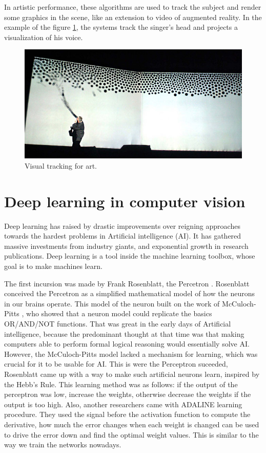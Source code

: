 In artistic performance, these algorithms are used to track the subject and render some graphics in the scene, like an extension to video of augmented reality. In the example of the figure \ref{introTracking4}, the systems track the singer's head and projects a visualization of his voice.

\begin{figure}[H]
\centering         
\includegraphics[width=12cm]{aplicaciones/singing.jpg}
\caption{Visual tracking for art.} \label{introTracking4}
\end{figure}


\section{Deep learning in computer vision}

Deep learning has raised by drastic improvements over reigning approaches towards the hardest problems in Artificial intelligence (AI). It has gathered massive investments from industry giants, and exponential growth in research publications. Deep learning is a tool inside the machine learning toolbox, whose goal is to make machines learn.

The first incursion was made by Frank Rosenblatt, the Percetron \cite{rosenblat}. Rosenblatt conceived the Percetron as a simplified mathematical model of how the neurons in our brains operate. This model of the neuron built on the work of McCuloch-Pitts \cite{McCulloch}, who showed that a neuron model could replicate the basics OR/AND/NOT functions. That was great in the early days of Artificial intelligence, because the predominant thought at that time was that making computers able to perform formal logical reasoning would essentially solve AI. However, the McCuloch-Pitts model lacked a mechanism for learning, which was crucial for it to be usable for AI. This is were the Perceptron suceeded, Rosenblatt came up with a way to make such artificial neurons learn, inspired by the Hebb's Rule. This learning method was as follows: if the output of the perceptron was low, increase the weights, otherwise decrease the weights if the output is too high. Also, another researchers came with ADALINE \cite{adaline} learning procedure. They used the signal before the activation function to compute the derivative, how much the error changes when each weight is changed can be used to drive the error down and find the optimal weight values. This is similar to the way we train the networks nowadays.

